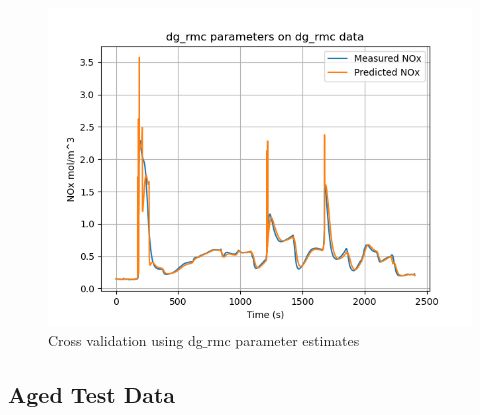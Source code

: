 \begin{figure}[H]
\begin{minipage}{0.3\textwidth}
                \includegraphics[width = \textwidth]{./figs/figs_new_mdl/dg_rmc_dg_rmc.png}
        \end{minipage}
        \caption{Cross validation using dg$\_$rmc parameter estimates}
\end{figure}


\subsection{Aged Test Data}

